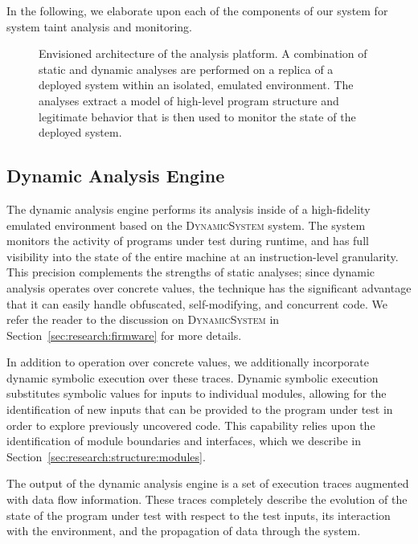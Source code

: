 \documentclass[letterpaper,twoside,11pt,headings=small]{scrartcl}
\newcommand{\dynamicsys}{\textsc{DynamicSystem}\xspace}
\begin{document}
In the following, we elaborate upon each of the components of our system for
system taint analysis and monitoring.

\begin{figure}[t]
    \centering
    \caption{Envisioned architecture of the analysis platform.
    A combination of static and dynamic analyses are performed on a replica
    of a deployed system within an isolated, emulated environment.
    The analyses extract a model of high-level program structure and
    legitimate behavior that is then used to monitor the state of the
    deployed system.}
    \label{fig:decomposition-arch}
\end{figure}

\subsection{Dynamic Analysis Engine}

The dynamic analysis engine performs its analysis inside of a high-fidelity
emulated environment based on the \dynamicsys system.  The system monitors the
activity of programs under test during runtime, and has full visibility into
the state of the entire machine at an instruction-level granularity.  This
precision complements the strengths of static analyses; since dynamic analysis
operates over concrete values, the technique has the significant advantage
that it can easily handle obfuscated, self-modifying, and concurrent code.  We
refer the reader to the discussion on \dynamicsys in
Section~\ref{sec:research:firmware} for more details.

In addition to operation over concrete values, we additionally incorporate
dynamic symbolic execution over these traces.  Dynamic symbolic execution
substitutes symbolic values for inputs to individual modules, allowing for the
identification of new inputs that can be provided to the program under test in
order to explore previously uncovered code.  This capability relies upon the
identification of module boundaries and interfaces, which we describe in
Section~\ref{sec:research:structure:modules}.

The output of the dynamic analysis engine is a set of execution traces
augmented with data flow information.  These traces completely describe the
evolution of the state of the program under test with respect to the test
inputs, its interaction with the environment, and the propagation of data
through the system.
\end{document}
